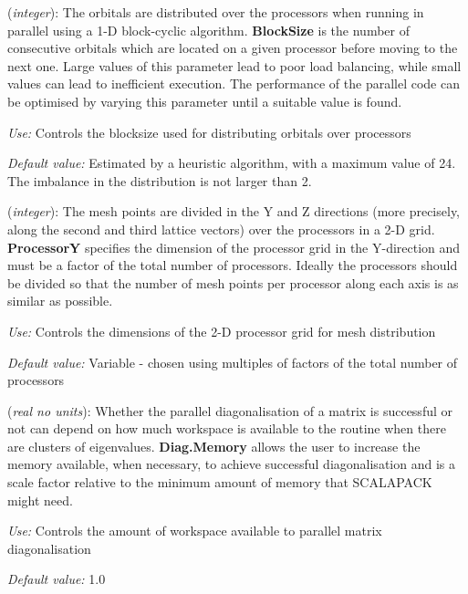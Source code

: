 \documentclass[11pt]{article}
\begin{document}
\begin{description}
\itemsep 10pt
\parsep 0pt

\item[{\bf BlockSize}] ({\it integer}):  The orbitals are distributed over the processors when
running in parallel using a 1-D block-cyclic algorithm. {\bf
BlockSize} is the number of consecutive orbitals which are located on
a given processor before moving to the next one. Large values of this
parameter lead to poor load balancing, while small values can lead to
inefficient execution.  The performance of the parallel code can be
optimised by varying this parameter until a suitable value is found.

{\it Use:} Controls the blocksize used for distributing orbitals over
processors

{\it Default value:}  Estimated by a heuristic algorithm, with a
maximum value of 24. The imbalance in the distribution is not
larger than 2.

\item[{\bf ProcessorY}] ({\it integer}):  The mesh points are divided in the Y and Z directions
(more precisely, along the second and third lattice vectors)
over the processors in a 2-D grid. {\bf ProcessorY} specifies the
dimension of the processor grid in the Y-direction and must be a
factor of the total number of processors. Ideally the processors
should be divided so that the number of mesh points per processor
along each axis is as similar as possible.

{\it Use:} Controls the dimensions of the 2-D processor grid for mesh
distribution

{\it Default value:} Variable - chosen using multiples of factors of
  the total number of processors

\item[{\bf Diag.Memory}] ({\it real no units}):
Whether the parallel diagonalisation of a matrix is successful or not can
depend on how much workspace is available to the routine when there are
clusters of eigenvalues. {\bf Diag.Memory} allows the user to increase
the memory available, when necessary, to achieve successful diagonalisation
and is a scale factor relative to the minimum amount of memory that
SCALAPACK might need.

{\it Use:} Controls the amount of workspace available to parallel
matrix diagonalisation

{\it Default value:}  1.0


\end{description}
\end{document}
